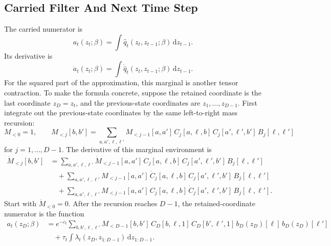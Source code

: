 \documentclass[11pt]{article}
\numberwithin{equation}{section}
\newcommand{\dd}{\,\mathrm d}
\begin{document}
\subsection{Carried Filter And Next Time Step}

The carried numerator is
\begin{equation}
    a_t(z_t;\beta)
    =
    \int \widehat q_t(z_t,z_{t-1};\beta)\dd z_{t-1}.
    \label{eq:p24-p19-73}
\end{equation}
Its derivative is
\begin{equation}
    \dot a_t(z_t;\beta)
    =
    \int \dot{\widehat q}_t(z_t,z_{t-1};\beta)\dd z_{t-1}.
    \label{eq:p24-p19-74}
\end{equation}
For the squared part of the approximation, this marginal is another tensor
contraction.  To make the formula concrete, suppose the retained coordinate is
the last coordinate \(z_D=z_t\), and the previous-state coordinates are
\(z_1,\ldots,z_{D-1}\).  First integrate out the previous-state coordinates by
the same left-to-right mass recursion:
\begin{equation}
    M_{<0}=1,
    \qquad
    M_{<j}[b,b']
    =
    \sum_{a,a',\ell,\ell'}
    M_{<j-1}[a,a']\,
    C_j[a,\ell,b]\,
    C_j[a',\ell',b']\,
    B_j[\ell,\ell']
    \label{eq:p24-p19-74a}
\end{equation}
for \(j=1,\ldots,D-1\).  The derivative of this marginal environment is
\begin{equation}
\begin{aligned}
    \dot M_{<j}[b,b']
    &=
    \sum_{a,a',\ell,\ell'}
    \dot M_{<j-1}[a,a']\,
    C_j[a,\ell,b]\,
    C_j[a',\ell',b']\,
    B_j[\ell,\ell']\\
    &\quad+
    \sum_{a,a',\ell,\ell'}
    M_{<j-1}[a,a']\,
    \dot C_j[a,\ell,b]\,
    C_j[a',\ell',b']\,
    B_j[\ell,\ell']\\
    &\quad+
    \sum_{a,a',\ell,\ell'}
    M_{<j-1}[a,a']\,
    C_j[a,\ell,b]\,
    \dot C_j[a',\ell',b']\,
    B_j[\ell,\ell'].
\end{aligned}
    \label{eq:p24-p19-74b}
\end{equation}
Start with \(\dot M_{<0}=0\).  After the recursion reaches \(D-1\), the
retained-coordinate numerator is the function
\begin{equation}
\begin{aligned}
    a_t(z_D;\beta)
    &=
    e^{-c_t}
    \sum_{b,b',\ell,\ell'}
    M_{<D-1}[b,b']\,
    C_D[b,\ell,1]\,
    C_D[b',\ell',1]\,
    b_D(z_D)[\ell]\,
    b_D(z_D)[\ell']\\
    &\quad+
    \tau_t
    \int \lambda_t(z_D,z_{1:D-1})\dd z_{1:D-1}.
\end{aligned}
    \label{eq:p24-p19-74c}
\end{equation}
\end{document}
